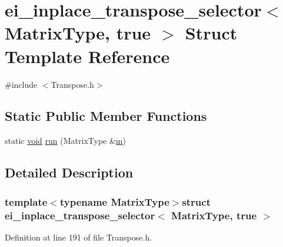 \hypertarget{structei__inplace__transpose__selector_3_01_matrix_type_00_01true_01_4}{\section{ei\-\_\-inplace\-\_\-transpose\-\_\-selector$<$ Matrix\-Type, true $>$ Struct Template Reference}
\label{structei__inplace__transpose__selector_3_01_matrix_type_00_01true_01_4}
}


{\ttfamily \#include $<$Transpose.\-h$>$}

\subsection*{Static Public Member Functions}
\begin{DoxyCompactItemize}
\item 
static \hyperlink{group___u_a_v_objects_plugin_ga444cf2ff3f0ecbe028adce838d373f5c}{void} \hyperlink{structei__inplace__transpose__selector_3_01_matrix_type_00_01true_01_4_a9cdc0cf731ca146f7a718f643f2b8870}{run} (Matrix\-Type \&\hyperlink{glext_8h_af593500c283bf1a787a6f947f503a5c2}{m})
\end{DoxyCompactItemize}


\subsection{Detailed Description}
\subsubsection*{template$<$typename Matrix\-Type$>$struct ei\-\_\-inplace\-\_\-transpose\-\_\-selector$<$ Matrix\-Type, true $>$}



Definition at line 191 of file Transpose.\-h.



